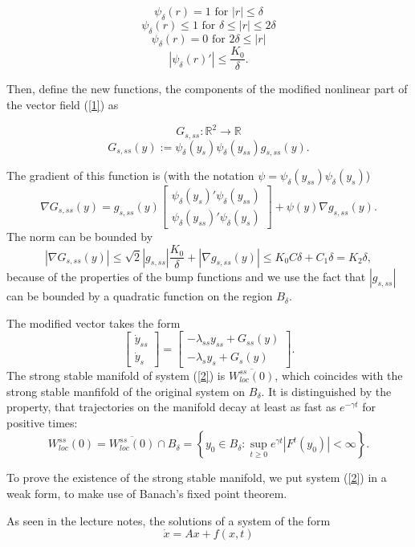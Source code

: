 \documentclass[a4paper,11pt,pdftex]{article}
\newcommand{\R}{\mathbb{R}}
\newcommand{\W}{W^{ss}_{loc}(0)}
\begin{document}
$$
\psi_\delta(r) = 1 \text{ for } |r|\leq \delta
$$
$$
\psi_\delta(r) \leq 1 \text{ for } \delta \leq |r|\leq 2\delta
$$
$$
\psi_\delta(r) = 0 \text{ for } 2\delta \leq |r|
$$
$$
|\psi_\delta(r)'| \leq \frac{K_0}{\delta}.
$$

Then, define the new functions, the components of the modified nonlinear part of the vector field (\ref{1}) as 

$$
G_{s, ss}: \R^2 \to \R
$$
$$
G_{s, ss}(y) := \psi_\delta(y_s)\psi_\delta(y_{ss})g_{s,ss}(y).
$$

The gradient of this function is (with the notation $\psi = \psi_\delta(y_{ss})\psi_\delta(y_s)$)
$$
\nabla G_{s, ss}(y) = g_{s,ss}(y)\begin{bmatrix}\psi_\delta(y_s)'\psi_\delta(y_{ss}) \\ \psi_\delta(y_{ss})'\psi_\delta(y_s) \end{bmatrix} + \psi(y) \nabla g_{s,ss}(y).
$$
The norm can be bounded by
$$
|\nabla G_{s, ss}(y) | \leq \sqrt{2}|g_{s,ss}|\frac{K_0}{\delta} + |\nabla g_{s,ss}(y)| \leq K_0 C \delta + C_1 \delta = K_2 \delta,
$$
because of the properties of the bump functions and we use the fact that $|g_{s,ss}|$ can be bounded by a quadratic function on the region $B_\delta$. 

The modified vector takes the form  
\begin{equation}
    \label{2}
    \begin{bmatrix}
    \dot{y}_{ss} \\
    \dot{y}_{s} 
    \end{bmatrix} = \begin{bmatrix} -\lambda_{ss} y_{ss} + G_{ss}(y)\\ -\lambda_{s} y_{s} + G_{s}(y)\end{bmatrix}.
\end{equation}
The strong stable manifold of system (\ref{2}) is $\overline{\W}$, which coincides with the strong stable manfifold of the original system on $B_\delta$. It is distinguished by the property, that trajectories on the manifold decay at least as fast as $e^{-\gamma t}$ for positive times:
$$
\W =\overline{\W}\cap B_\delta = \left\{ y_0\in B_\delta : \sup_{t\geq 0} e^{\gamma t}|F^t(y_0)| < \infty \right \}.
$$

To prove the existence of the strong stable manifold, we put system (\ref{2}) in a weak form, to make use of Banach's fixed point theorem. 

As seen in the lecture notes, the solutions of a system of the form
$$
\dot{x} = Ax + f(x,t)
$$
\end{document}
